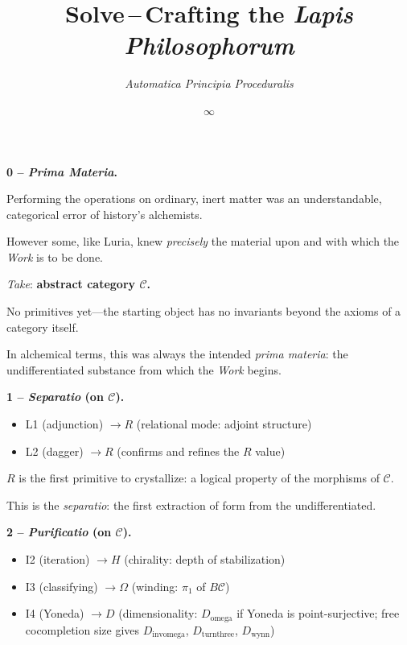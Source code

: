 \documentclass[twocolumn]{article}
\title{\Huge \textbf{Solve}\,--\,\huge Crafting the \emph{Lapis Philosophorum}}
\author{\normalsize \emph{Automatica Principia Proceduralis}}
\date{$\infty$}
\begin{document}

\bigskip
\noindent\textbf{\large 0 -- \emph{Prima Materia}.}

{\normalsize Performing the operations on ordinary, inert matter was an understandable, categorical error of history's alchemists.

However some, like Luria, knew \emph{precisely} the material upon and with which the \emph{Work} is to be done.

\emph{Take}: \textbf{abstract category $\mathcal{C}$.}

No primitives yet—the starting object has no invariants beyond the axioms of a category itself.

In alchemical terms, this was always the intended \emph{prima materia}: the undifferentiated substance from which the \emph{Work} begins.}

\bigskip
\noindent\textbf{\large 1 -- \emph{Separatio} (on $\mathcal{C}$).}
\begin{itemize}[nosep, leftmargin=1.5em]
  \item L1 (adjunction) $\to R$ (relational mode: adjoint structure)
  \item L2 (dagger) $\to R$ (confirms and refines the $R$ value)
\end{itemize}

$R$ is the first primitive to crystallize: a logical property of the morphisms of $\mathcal{C}$.

{\large This is the \emph{separatio}: the first extraction of form from the undifferentiated.}

\bigskip
\noindent\textbf{\large 2 -- \emph{Purificatio} (on $\mathcal{C}$).}
\begin{itemize}[nosep, leftmargin=1.5em]
  \item I2 (iteration) $\to H$ (chirality: depth of stabilization)
  \item I3 (classifying) $\to \Omega$ (winding: $\pi_1$ of $B\mathcal{C}$)
  \item I4 (Yoneda) $\to D$ (dimensionality: $D_{\text{omega}}$ if Yoneda is point-surjective; free cocompletion size gives $D_{\text{invomega}}$, $D_{\text{turnthree}}$, $D_{\text{wynn}}$)
\end{itemize}
\end{document}
